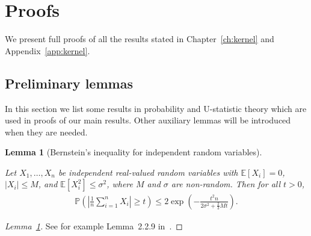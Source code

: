 \documentclass[11pt,lof]{puthesis}
\renewcommand{\P}{\ensuremath{\mathbb{P}}}
\newcommand{\E}{\ensuremath{\mathbb{E}}}
\theoremstyle{break}
\newtheorem{lemma}{Lemma}[section]
\theoremstyle{proof}
\newtheorem{proof}{Proof}
\begin{document}
\section{Proofs}
\label{sec:kernel_app_proofs}

We present full proofs of all the results stated in
Chapter~\ref{ch:kernel} and Appendix~\ref{app:kernel}.

\subsection{Preliminary lemmas}

In this section we list some results
in probability and U-statistic theory
which are used in proofs of our main results.
Other auxiliary lemmas will be introduced when
they are needed.

\begin{lemma}[Bernstein's inequality for independent random variables]
\label{lem:kernel_app_bernstein}

Let $X_1, \ldots, X_n$ be independent real-valued
random variables with
$\E[X_i] = 0$, $|X_i| \leq M$, and
$\E[X_i^2] \leq \sigma^2$,
where $M$ and $\sigma$ are non-random.
Then for all $t>0$,
%
\begin{align*}
\P \left(
\left| \frac{1}{n} \sum_{i=1}^n X_i \right| \geq t
\right)
\leq 2 \exp \left( -
\frac{t^2 n}
{2 \sigma^2 + \frac{2}{3} M t}
\right).
\end{align*}

\end{lemma}

\begin{proof}[Lemma~\ref{lem:kernel_app_bernstein}]

See for example
Lemma~2.2.9 in~\citet{van1996weak}.
\end{proof}
\end{document}
